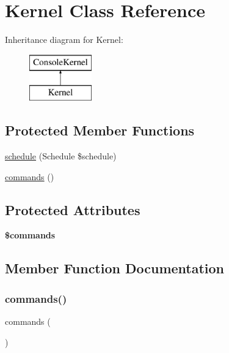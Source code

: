 \hypertarget{class_app_1_1_console_1_1_kernel}{}\section{Kernel Class Reference}
\label{class_app_1_1_console_1_1_kernel}
Inheritance diagram for Kernel\+:\begin{figure}[H]
\begin{center}
\leavevmode
\includegraphics[height=2.000000cm]{class_app_1_1_console_1_1_kernel}
\end{center}
\end{figure}
\subsection*{Protected Member Functions}
\begin{DoxyCompactItemize}
\item 
\mbox{\hyperlink{class_app_1_1_console_1_1_kernel_ac8f0af578c80277b7a25381c6a9e268c}{schedule}} (Schedule \$schedule)
\item 
\mbox{\hyperlink{class_app_1_1_console_1_1_kernel_af0afefa0d79d09344a638cf6c532aa39}{commands}} ()
\end{DoxyCompactItemize}
\subsection*{Protected Attributes}
\begin{DoxyCompactItemize}
\item 
{\bfseries \$commands}
\end{DoxyCompactItemize}


\subsection{Member Function Documentation}
\mbox{\label{class_app_1_1_console_1_1_kernel_af0afefa0d79d09344a638cf6c532aa39}} 
\subsubsection{\texorpdfstring{commands()}{commands()}}
{\footnotesize\ttfamily commands (\begin{DoxyParamCaption}{ }\end{DoxyParamCaption})\hspace{0.3cm}{\ttfamily [protected]}}

